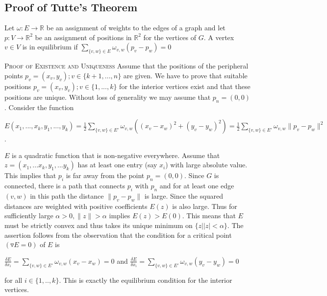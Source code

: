 \documentclass{article}
\newcommand{\R}{\mathbb{R}}
\begin{document}
\subsection{Proof of Tutte's Theorem}
Let $\omega : E \rightarrow \R$ be an assignment of weights to the edges of a graph and let $p:V \rightarrow \R^2$ be an assignment of positions in $\R^2$ for the vertices of $G$. A vertex $v \in V$ is in equilibrium if  $\sum\limits_{\{v,w\} \in E} \omega_{v,w}(p_v - p_w) = 0$

\textsc {Proof of Existence and Uniqueness}  Assume that the positions of the peripheral points $p_v = (x_v,y_v); v \in \{k+1,...,n\}$ are given. We have to prove that suitable positions $p_v = (x_v,y_v); v \in \{1,...,k\}$ for the interior vertices exist and that these positions are unique. Without loss of generality we may assume that $p_n = (0,0)$. Consider the function
\begin{center}
$E(x_1,...,x_k,y_1,...,y_k) = \frac{1}{2} \sum\limits_{\{v,w\} \in E'} \omega_{v,w}((x_v - x_w)^2 + (y_v - y_w)^2) 
= \frac{1}{2} \sum\limits_{\{v,w\} \in E'} \omega_{v,w} \|p_v - p_w\|^2$. \\
\end{center}
$E$ is a quadratic function that is non-negative everywhere. Assume that $z=(x_1,...x_k,y_1,...y_k)$ has at least one entry (say $x_i$) with large absolute value. This implies that $p_i$ is far away from the point $p_n = (0,0)$. Since $G$ is connected, there is a path that connects $p_i$ with $p_n$ and for at least one edge $(v,w)$ in this path the distance $\|p_v - p_w\|$ is large. Since the squared distances are weighted with positive coefficients $E(z)$ is also large. Thus for sufficiently large $\alpha > 0, \|z\| > \alpha$ implies $E(z) > E(0)$. This means that $E$ must be strictly convex and thus takes its unique minimum on $\{z | |z| < \alpha \}$. The assertion follows from the observation that the condition for a critical point $(\triangledown E = 0)$ of $E$ is
\begin{center}
$\frac{\delta E}{\delta x_i} = \sum\limits_{\{v,w\} \in E'} \omega_{v,w}(x_v - x_w) = 0$ and $\frac{\delta E}{\delta x_i} = \sum\limits_{\{v,w\} \in E'} \omega_{v,w}(y_v - y_w) = 0$
\end{center}
for all $i \in \{1,..,k\}$. This is exactly the equilibrium condition for the interior vertices.













\end{document}
